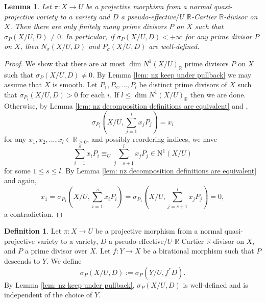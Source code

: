 \documentclass[11pt]{amsart}
\numberwithin{equation}{section}
\newcommand{\Rr}{\mathbb{R}}
\newtheorem{lem}[thm]{Lemma}
\theoremstyle{definition}
\newtheorem{defn}[thm]{Definition}
\theoremstyle{definition}
\theoremstyle{definition}
\begin{document}
\begin{lem}\label{lem: nz finite is well-defined}
Let $\pi: X\rightarrow U$ be a projective morphism from a normal quasi-projective variety to a variety and $D$ a pseudo-effective$/U$ $\Rr$-Cartier $\Rr$-divisor on $X$. Then there are only finitely many prime divisors $P$ on $X$ such that $\sigma_P(X/U,D)\not=0$. In particular, if $\sigma_P(X/U,D)<+\infty$ for any prime divisor $P$ on $X$, then $N_{\sigma}(X/U,D)$ and $P_{\sigma}(X/U,D)$ are well-defined.
\end{lem}
\begin{proof}
We show that there are at most $\dim N^1(X/U)_{\Rr}$ prime divisors $P$ on $X$ such that $\sigma_P(X/U,D)\not=0$. By Lemma \ref{lem: nz keep under pullback} we may assume that $X$ is smooth. Let $P_1,P_2,...,P_l$ be distinct prime divisors of $X$ such that $\sigma_{P_i}(X/U,D)>0$ for each $i$.  If $l\leq\dim N^1(X/U)_{\Rr}$ then we are done. Otherwise, by Lemma \ref{lem: nz decomposition definitions are equivalent} and \cite[III, Lemma 4.2(2)]{Nak04},
$$\sigma_{P_i}(X/U,\sum^{l}_{j=1}x_jP_j)=x_i$$
for any $x_1,x_2,...,x_l\in\Rr_{\ge0}$, and possibly reordering indices, we have
$$\sum_{i=1}^{s}x_iP_i\equiv_U\sum_{j=s+1}^{l}x_jP_j\in\mathrm{N}^1(X/U)$$
for some $1\le s\le l$. By Lemma \ref{lem: nz decomposition definitions are equivalent} and \cite[III, Lemma 4.2(2)]{Nak04} again,
$$
x_1=\sigma_{P_1}(X/U,\sum^{s}_{i=1}x_iP_i)=\sigma_{P_1}(X/U,\sum^{l}_{j=s+1}x_jP_j)=0,
$$
a contradiction.
\end{proof}



\begin{defn}\label{defn: sigma over X}
Let $\pi: X\rightarrow U$ be a projective morphism from a normal quasi-projective variety to a variety, $D$ a pseudo-effective$/U$ $\Rr$-Cartier $\Rr$-divisor on $X$, and $P$ a prime divisor over $X$. Let $f: Y\rightarrow X$ be a birational morphism such that $P$ descends to $Y$. We define
$$\sigma_P(X/U,D):=\sigma_P(Y/U,f^*D).$$
By Lemma \ref{lem: nz keep under pullback}, $\sigma_P(X/U,D)$ is well-defined and is independent of the choice of $Y$.
\end{defn}
\end{document}
